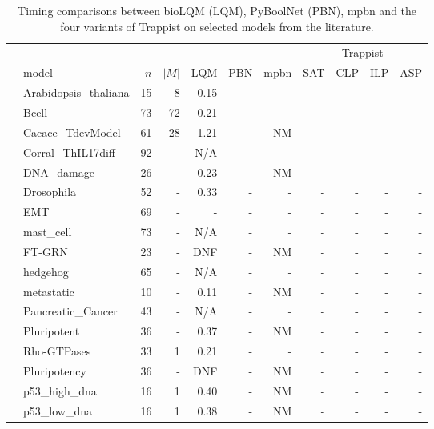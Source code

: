 \documentclass[preprint,12pt]{elsarticle}
\newcounter{rownumber}
\newcommand\rownb{\stepcounter{rownumber}\arabic{rownumber}}
\begin{document}
\begin{table}[!htb]
  \caption{Timing comparisons between bioLQM (LQM), PyBoolNet (PBN), mpbn and the four variants of Trappist on selected models from the literature.}
  \centering%
  \label{tab:result_real}
  \begin{tabular}{rlrrrrrrrrr}
    \toprule
    & & & & & & & \multicolumn{4}{c}{Trappist}\\
    \cmidrule(rr){8-11}
    & model & \(n\) & \(|M|\) & LQM & PBN & mpbn & SAT & CLP & ILP & ASP \\
    \midrule %
    \rownb & Arabidopsis\_thaliana & 15 & 8 & 0.15 & - & - & - & - & - & - \\
    \rownb & Bcell & 73 & 72 & 0.21 & - & - & - & - & - & - \\
    \rownb & Cacace\_TdevModel & 61 & 28 & 1.21 & - & NM & - & - & - & - \\
    \rownb & Corral\_ThIL17diff & 92 & - & N/A & - & - & - & - & - & - \\
    \rownb & DNA\_damage & 26 & - & 0.23 & - & NM & - & - & - & - \\
    \rownb & Drosophila & 52 & - & 0.33 & - & - & - & - & - & - \\
    \rownb & EMT & 69 & - & - & - & - & - & - & - & - \\
    \rownb & mast\_cell & 73 & - & N/A & - & - & - & - & - & - \\
    \rownb & FT-GRN & 23 & - & DNF & - & NM & - & - & - & - \\
    \rownb & hedgehog & 65 & - & N/A & - & - & - & - & - & - \\
    \rownb & metastatic & 10 & - & 0.11 & - & NM & - & - & - & - \\
    \rownb & Pancreatic\_Cancer & 43 & - & N/A & - & - & - & - & - & - \\
    \rownb & Pluripotent & 36 & - & 0.37 & - & NM & - & - & - & - \\
    \rownb & Rho-GTPases & 33 & 1 & 0.21 & - & - & - & - & - & - \\
    \rownb & Pluripotency & 36 & - & DNF & - & NM & - & - & - & - \\
    \rownb & p53\_high\_dna & 16 & 1 & 0.40 & - & NM & - & - & - & - \\
    \rownb & p53\_low\_dna & 16 & 1 & 0.38 & - & NM & - & - & - & - \\
    

\end{tabular}
\end{table}
\end{document}
